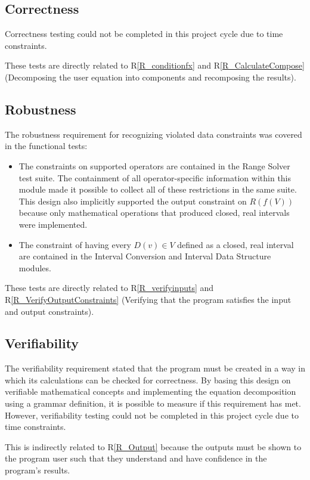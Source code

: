 \documentclass[12pt, titlepage]{article}
\newcommand{\rref}[1]{R\ref{#1}}
\begin{document}
\subsection{Correctness}
Correctness testing could not be completed in this project cycle due to time 
constraints.

These tests are directly related to \rref{R_conditionfx} and 
\rref{R_CalculateCompose} (Decomposing the user equation into components and 
recomposing the results).

\subsection{Robustness}
The robustness requirement for recognizing violated data constraints was 
covered in the functional tests:

\begin{itemize}
	\item The constraints on supported operators are contained in the Range 
	Solver test suite. The containment of all operator-specific information 
	within this module made it possible to collect all of these restrictions in 
	the same suite. This design also implicitly supported the output constraint 
	on $R(f(V))$ because only mathematical operations that produced closed, 
	real intervals were implemented.
	\item The constraint of having every $D(v) \in V$ defined as a closed, real 
	interval are contained in the Interval Conversion and Interval Data 
	Structure modules.
\end{itemize}

These tests are directly related to \rref{R_verifyinputs} and 
\rref{R_VerifyOutputConstraints} (Verifying that the program satisfies the 
input and output constraints).

\subsection{Verifiability}
The verifiability requirement stated that the program must be created in a way 
in which its calculations can be checked for correctness. By basing this design 
on verifiable mathematical concepts and implementing the equation decomposition 
using a grammar definition, it is possible to measure if this requirement has 
met. However, verifiability testing could not be completed in this project 
cycle due to time constraints.

This is indirectly related to \rref{R_Output} because the outputs must be shown 
to the program user such that they understand and have confidence in the 
program's results.
\end{document}
